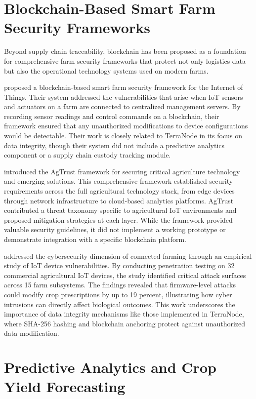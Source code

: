 \section{Blockchain-Based Smart Farm Security Frameworks}

Beyond supply chain traceability, blockchain has been proposed as a foundation for comprehensive farm security frameworks that protect not only logistics data but also the operational technology systems used on modern farms.

\textcite{alabsi2023blockchain} proposed a blockchain-based smart farm security framework for the Internet of Things. Their system addressed the vulnerabilities that arise when IoT sensors and actuators on a farm are connected to centralized management servers. By recording sensor readings and control commands on a blockchain, their framework ensured that any unauthorized modifications to device configurations would be detectable. Their work is closely related to TerraNode in its focus on data integrity, though their system did not include a predictive analytics component or a supply chain custody tracking module.

\textcite{agtrust2026framework} introduced the AgTrust framework for securing critical agriculture technology and emerging solutions. This comprehensive framework established security requirements across the full agricultural technology stack, from edge devices through network infrastructure to cloud-based analytics platforms. AgTrust contributed a threat taxonomy specific to agricultural IoT environments and proposed mitigation strategies at each layer. While the framework provided valuable security guidelines, it did not implement a working prototype or demonstrate integration with a specific blockchain platform.

\textcite{dzreke2025securing} addressed the cybersecurity dimension of connected farming through an empirical study of IoT device vulnerabilities. By conducting penetration testing on 32 commercial agricultural IoT devices, the study identified critical attack surfaces across 15 farm subsystems. The findings revealed that firmware-level attacks could modify crop prescriptions by up to 19 percent, illustrating how cyber intrusions can directly affect biological outcomes. This work underscores the importance of data integrity mechanisms like those implemented in TerraNode, where SHA-256 hashing and blockchain anchoring protect against unauthorized data modification.

\section{Predictive Analytics and Crop Yield Forecasting}

